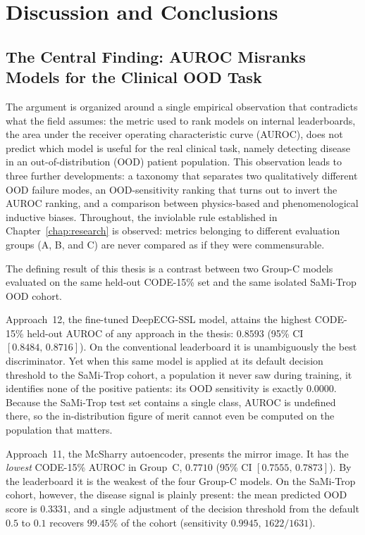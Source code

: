 \chapter{Discussion and Conclusions}
\label{chap:conclusions}
\label{chap:discussion}

\section{The Central Finding: AUROC Misranks Models for the Clinical OOD Task}
\label{sec:central_finding}

The argument is organized around a single empirical observation that contradicts what the field assumes: the metric used to rank models on internal leaderboards, the area under the receiver operating characteristic curve (AUROC), does not predict which model is useful for the real clinical task, namely detecting disease in an out-of-distribution (OOD) patient population. This observation leads to three further developments: a taxonomy that separates two qualitatively different OOD failure modes, an OOD-sensitivity ranking that turns out to invert the AUROC ranking, and a comparison between physics-based and phenomenological inductive biases. Throughout, the inviolable rule established in Chapter~\ref{chap:research} is observed: metrics belonging to different evaluation groups (A, B, and C) are never compared as if they were commensurable.

The defining result of this thesis is a contrast between two Group-C models evaluated on the same held-out CODE-15\% set and the same isolated SaMi-Trop OOD cohort.

Approach~12, the fine-tuned DeepECG-SSL model, attains the highest CODE-15\% held-out AUROC of any approach in the thesis: $0.8593$ (95\% CI $[0.8484,\,0.8716]$). On the conventional leaderboard it is unambiguously the best discriminator. Yet when this same model is applied at its default decision threshold to the SaMi-Trop cohort, a population it never saw during training, it identifies none of the positive patients: its OOD sensitivity is exactly $0.0000$. Because the SaMi-Trop test set contains a single class, AUROC is undefined there, so the in-distribution figure of merit cannot even be computed on the population that matters.

Approach~11, the McSharry autoencoder, presents the mirror image. It has the \emph{lowest} CODE-15\% AUROC in Group~C, $0.7710$ (95\% CI $[0.7555,\,0.7873]$). By the leaderboard it is the weakest of the four Group-C models. On the SaMi-Trop cohort, however, the disease signal is plainly present: the mean predicted OOD score is $0.3331$, and a single adjustment of the decision threshold from the default $0.5$ to $0.1$ recovers $99.45\%$ of the cohort (sensitivity $0.9945$, $1622/1631$).

